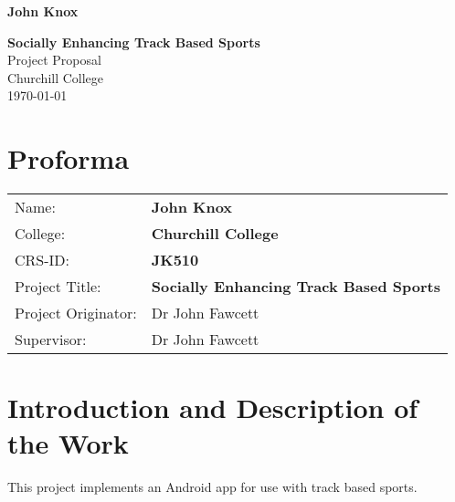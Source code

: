 \documentclass[12pt,twoside,notitlepage]{report}
\begin{document}





\pagestyle{empty}

\hfill{\LARGE \bf John Knox}

\vspace*{60mm}
\begin{center}
\Huge
{\bf Socially Enhancing Track Based Sports} \\
\vspace*{5mm}
Project Proposal \\
\vspace*{5mm}
Churchill College \\
\vspace*{5mm}
\today  %
\end{center}


\setcounter{page}{1}
\pagestyle{plain}
\newpage

\section*{Proforma}

{\large
\begin{tabular}{ll}
Name:               & \bf John Knox                             \\
College:            & \bf Churchill College                     \\
CRS-ID:             & \bf JK510                                 \\
Project Title:      & \bf Socially Enhancing Track Based Sports \\
Project Originator: & Dr John Fawcett                           \\
Supervisor:         & Dr John Fawcett                           \\ 
\end{tabular}
}

\section*{Introduction and Description of the Work}

This project implements an Android app for use with track based sports.
\end{document}
